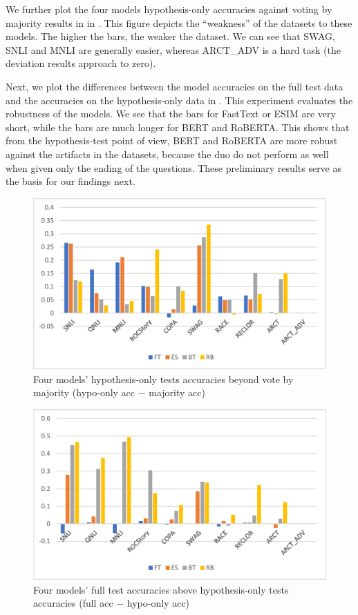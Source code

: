 We further plot the four models hypothesis-only accuracies against voting by majority
results in  in . 
This figure depicts the ``weakness'' of the datasets to these models. 
The higher the bars, the weaker the dataset. We can see that SWAG, SNLI and MNLI
are generally easier, whereas ARCT\_ADV is a hard task (the deviation results
approach to zero).

Next, we plot the differences between the model accuracies on the full test data
and the accuracies on the hypothesis-only data in . 
This experiment evaluates the robustness of the models. 
We see that the bars for FastText or ESIM are very short, while
the bars are much longer for BERT and RoBERTA. This shows that from 
the hypothesis-test point of view, BERT and RoBERTA are more robust 
against the artifacts in the datasets, because the duo do not 
perform as well when given only
the ending of the questions. 
These preliminary results serve as the basis for our findings next.

\begin{figure}[th]
\centering
\includegraphics[width=\columnwidth]{picture/ending1.eps}
\caption{Four models' hypothesis-only tests accuracies beyond vote by majority (hypo-only
acc $-$ majority acc)}
\label{fig:ending1}
\end{figure}

\begin{figure}[th]
\centering
\includegraphics[width=\columnwidth]{picture/ending2.eps}
\caption{Four models' full test accuracies above hypothesis-only tests accuracies (full acc $-$
hypo-only acc)}
\label{fig:ending2}
\end{figure}

